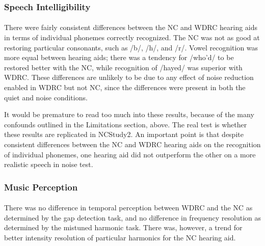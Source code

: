 \subsubsection{Speech Intelligibility}
\paragraph{}There were fairly consistent differences between the NC and WDRC hearing aids in terms of individual phonemes correctly recognized.  The NC was not as good at restoring particular consonants, such as /b/, /h/, and /r/.  Vowel recognition was more equal between hearing aids; there was a tendency for /who'd/ to be restored better with the NC, while recognition of /hayed/ was superior with WDRC.  These differences are unlikely to be due to any effect of noise reduction enabled in WDRC but not NC, since the differences were present in both the quiet and noise conditions.

It would be premature to read too much into these results, because of the many confounds outlined in the Limitations section, above.  The real test is whether these results are replicated in NCStudy2. An important point is that despite consistent differences between the NC and WDRC hearing aids on the recognition of individual phonemes, one hearing aid did not outperform the other on a more realistic speech in noise test.

\subsubsection{Music Perception}
\paragraph{}There was no difference in temporal perception between WDRC and the NC as determined by the gap detection task, and no difference in frequency resolution as determined by the mistuned harmonic task.  There was, however, a trend for better intensity resolution of particular harmonics for the NC hearing aid.

